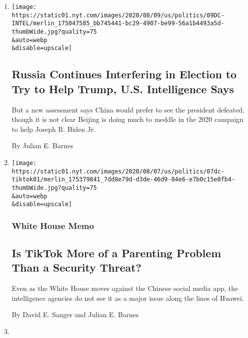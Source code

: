 \begin{enumerate}
\def\labelenumi{\arabic{enumi}.}
\item
  \href{/2020/08/07/us/politics/russia-china-trump-biden-election-interference.html}{}

  \texttt{[image: https://static01.nyt.com/images/2020/08/09/us/politics/09DC-INTEL/merlin\_175047585\_bb745441-bc29-4907-be99-56a1b4493a5d-thumbWide.jpg?quality=75\\\&auto=webp\\\&disable=upscale]}

  \hypertarget{russia-continues-interfering-in-election-to-try-to-help-trump-us-intelligence-says}{%
  \subsection{Russia Continues Interfering in Election to Try to Help
  Trump, U.S. Intelligence
  Says}\label{russia-continues-interfering-in-election-to-try-to-help-trump-us-intelligence-says}}

  But a new assessment says China would prefer to see the president
  defeated, though it is not clear Beijing is doing much to meddle in
  the 2020 campaign to help Joseph R. Biden Jr.

  By Julian E. Barnes
\item
  \href{/2020/08/07/us/politics/tiktok-security-threat.html}{}

  \texttt{[image: https://static01.nyt.com/images/2020/08/07/us/politics/07dc-tiktok01/merlin\_175379841\_7dd8e79d-d3de-46d9-84e6-e7b0c15e8fb4-thumbWide.jpg?quality=75\\\&auto=webp\\\&disable=upscale]}

  \hypertarget{white-house-memo}{%
  \subsubsection{White House Memo}\label{white-house-memo}}

  \hypertarget{is-tiktok-more-of-a-parenting-problem-than-a-security-threat}{%
  \subsection{Is TikTok More of a Parenting Problem Than a Security
  Threat?}\label{is-tiktok-more-of-a-parenting-problem-than-a-security-threat}}

  Even as the White House moves against the Chinese social media app,
  the intelligence agencies do not see it as a major issue along the
  lines of Huawei.

  By David E. Sanger and Julian E. Barnes
\item
  \href{/2020/08/06/us/politics/election-meddling-texts-russia-iran.html}{}


\end{enumerate}
